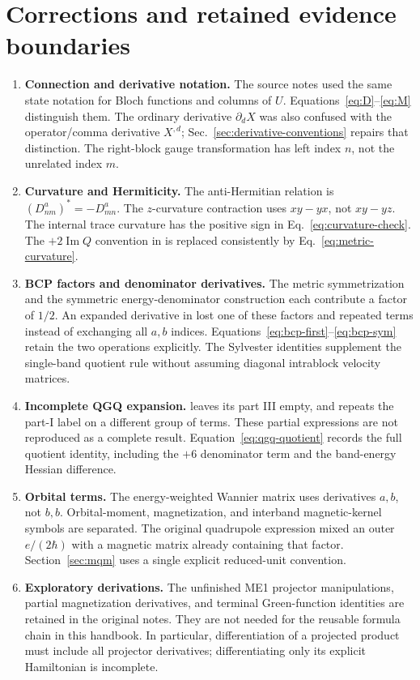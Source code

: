 \documentclass[prx,amsmath,amssymb,superscriptaddress,longbibliography]{revtex4-2}
\newcommand{\Ima}{\operatorname{Im}}
\newcommand{\code}[1]{\texttt{\detokenize{#1}}}
\begin{document}
\section{Corrections and retained evidence boundaries}
\label{app:corrections}
\begin{enumerate}
 \item \textbf{Connection and derivative notation.}
 The source notes used the same state notation for Bloch functions and
 columns of $U$. Equations~\eqref{eq:D}--\eqref{eq:M} distinguish them.
 The ordinary derivative $\partial_d X$ was also confused with the
 operator/comma derivative $X^{,d}$; Sec.~\ref{sec:derivative-conventions} repairs that distinction.
 The right-block gauge transformation has left index $n$, not the unrelated index $m$.
 \item \textbf{Curvature and Hermiticity.}
 The anti-Hermitian relation is $(D_{nm}^a)^*=-D_{mn}^a$.
 The $z$-curvature contraction uses $xy-yx$, not $xy-yz$.
 The internal trace curvature has the positive sign in
 Eq.~\eqref{eq:curvature-check}.
 The $+2\Ima Q$ convention in \code{QGD.tex} is replaced consistently by
 Eq.~\eqref{eq:metric-curvature}.
 \item \textbf{BCP factors and denominator derivatives.}
 The metric symmetrization and the symmetric energy-denominator construction
 each contribute a factor of $1/2$.
 An expanded derivative in \code{Wannier.tex} lost one of these factors
 and repeated terms instead of exchanging all $a,b$ indices.
 Equations~\eqref{eq:bcp-first}--\eqref{eq:bcp-sym} retain the two operations explicitly.
 The Sylvester identities supplement the single-band quotient rule without
 assuming diagonal intrablock velocity matrices.
 \item \textbf{Incomplete QGQ expansion.}
 \code{Wannier.tex} leaves its part III empty, and \code{QGD.tex} repeats
 the part-I label on a different group of terms.
 These partial expressions are not reproduced as a complete result.
 Equation~\eqref{eq:qgq-quotient} records the full quotient identity, including
 the $+6$ denominator term and the band-energy Hessian difference.
 \item \textbf{Orbital terms.}
 The energy-weighted Wannier matrix uses derivatives $a,b$, not $b,b$.
 Orbital-moment, magnetization, and interband magnetic-kernel symbols are separated.
 The original quadrupole expression mixed an outer $e/(2\hbar)$ with a magnetic
 matrix already containing that factor. Section~\ref{sec:mqm} uses a single
 explicit reduced-unit convention.
 \item \textbf{Exploratory derivations.}
 The unfinished ME1 projector manipulations, partial magnetization derivatives,
 and terminal Green-function identities are retained in the original notes.
 They are not needed for the reusable formula chain in this handbook.
 In particular, differentiation of a projected product must include all
 projector derivatives; differentiating only its explicit Hamiltonian is incomplete.
\end{enumerate}
\end{document}
